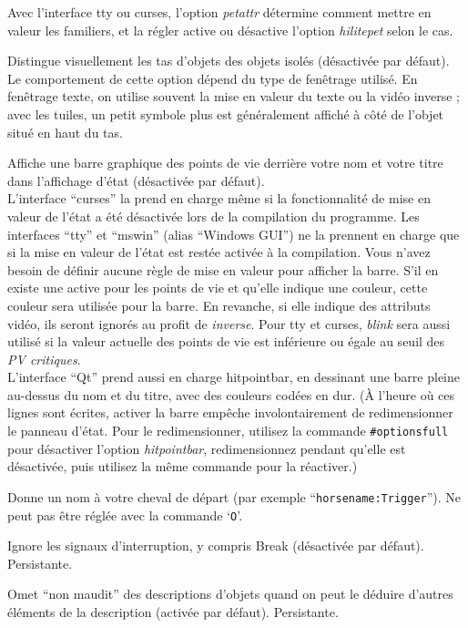 \documentclass[titlepage]{article}
\begin{document}
\begin{description}[font=\mdseries\itshape]
Avec l'interface tty ou curses, l'option \textit{petattr}
détermine comment mettre en valeur les familiers, et la régler active ou désactive
l'option \textit{hilite\textunderscore pet} selon le cas.
\item[hilite\textunderscore pile]
Distingue visuellement les tas d'objets des objets isolés (désactivée par défaut).
Le comportement de cette option dépend du type de fenêtrage utilisé.
En fenêtrage texte, on utilise souvent la mise en valeur du texte ou la vidéo inverse ;
avec les tuiles, un petit symbole plus est généralement affiché à côté de l'objet
situé en haut du tas.
\item[hitpointbar]
Affiche une barre graphique des points de vie derrière votre nom et votre titre dans
l'affichage d'état (désactivée par défaut).
\\
L'interface ``curses'' la prend en charge même si la fonctionnalité de mise en valeur
de l'état a été désactivée lors de la compilation du programme.
Les interfaces ``tty'' et ``mswin'' (alias ``Windows GUI'') ne la
prennent en charge que si la mise en valeur de l'état est restée activée à la compilation.
Vous n'avez besoin de définir aucune règle de mise en valeur pour afficher
la barre.
S'il en existe une active pour les points de vie et qu'elle indique une couleur, cette
couleur sera utilisée pour la barre.
En revanche, si elle indique des attributs vidéo, ils seront ignorés au
profit de \textit{inverse}.
Pour tty et curses, \textit{blink} sera aussi utilisé si la valeur actuelle
des points de vie est inférieure ou égale au seuil des \textit{PV critiques}.
\\
L'interface ``Qt'' prend aussi en charge hitpointbar, en dessinant
une barre pleine au-dessus du nom et du titre, avec des couleurs codées en dur.
(À l'heure où ces lignes sont écrites, activer la barre empêche involontairement
de redimensionner le panneau d'état.
Pour le redimensionner, utilisez la commande \texttt{\#optionsfull} pour désactiver
l'option \textit{hitpointbar}, redimensionnez pendant qu'elle est désactivée, puis
utilisez la même commande pour la réactiver.)
\item[horsename]
Donne un nom à votre cheval de départ (par exemple ``\texttt{horsename:Trigger}'').
Ne peut pas être réglée avec la commande `\texttt{O}'.
\item[ignintr]
Ignore les signaux d'interruption, y compris Break (désactivée par défaut). Persistante.
\item[implicit\textunderscore uncursed]
Omet ``non maudit'' des descriptions d'objets quand on peut le déduire
d'autres éléments de la description (activée par défaut).
Persistante.


\end{description}
\end{document}
